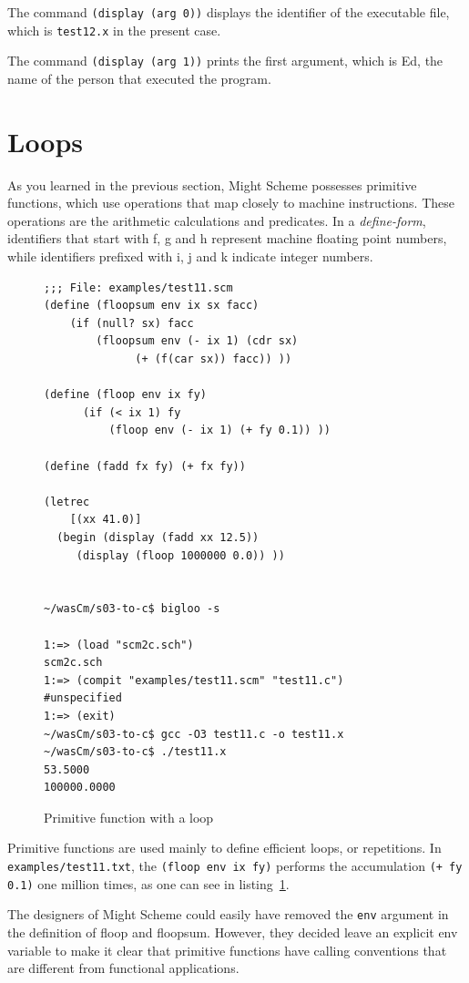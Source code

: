 \documentclass[a4paper,12pt]{book}
\begin{document}
The command \verb|(display (arg 0))| displays the identifier
of the executable file, which is \verb|test12.x| in the present
case.

The command \verb|(display (arg 1))| prints the first argument,
which is Ed, the name of the person that executed the program.


\section{Loops}
As you learned in the previous section,
Might Scheme possesses primitive functions, which
use operations that map closely to machine
instructions. These operations are the arithmetic
calculations and predicates. In
a {\em define-form}, identifiers that start with
f, g and h represent machine floating point
numbers, while identifiers prefixed with i, j
and k indicate integer numbers.

\begin{figure}[!h]
\begin{verbatim}
;;; File: examples/test11.scm
(define (floopsum env ix sx facc)
    (if (null? sx) facc
        (floopsum env (- ix 1) (cdr sx)
              (+ (f(car sx)) facc)) ))

(define (floop env ix fy)
      (if (< ix 1) fy
          (floop env (- ix 1) (+ fy 0.1)) ))

(define (fadd fx fy) (+ fx fy))

(letrec
    [(xx 41.0)]
  (begin (display (fadd xx 12.5))
     (display (floop 1000000 0.0)) ))


~/wasCm/s03-to-c$ bigloo -s

1:=> (load "scm2c.sch")
scm2c.sch
1:=> (compit "examples/test11.scm" "test11.c")
#unspecified
1:=> (exit)
~/wasCm/s03-to-c$ gcc -O3 test11.c -o test11.x
~/wasCm/s03-to-c$ ./test11.x 
53.5000
100000.0000
\end{verbatim}
\caption{Primitive function with a loop}
\label{fig:floop}
\end{figure}


Primitive functions are used mainly to define
efficient loops, or repetitions.
In \verb|examples/test11.txt|, the
\verb|(floop env ix fy)| performs the accumulation
\verb|(+ fy 0.1)| one million times, as one
can see in listing~\ref{fig:floop}.

The designers of Might Scheme could easily have removed the
\verb|env| argument in the definition of floop and floopsum.
However, they decided leave an explicit env variable to make
it clear that primitive functions have calling conventions that
are different from functional applications.
\end{document}
